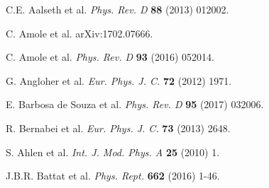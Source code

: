 \documentclass{article}
\begin{document}
\begin{thebibliography}{100}
C.E. Aalseth et al. \textit{Phys. Rev. D} \textbf{88} (2013) 012002.

C. Amole et al. arXiv:1702.07666.

C. Amole et al. \textit{Phys. Rev. D} \textbf{93} (2016) 052014.

G. Angloher et al. \textit{Eur. Phys. J. C.} \textbf{72} (2012) 1971.

E. Barbosa de Souza et al. \textit{Phys. Rev. D} \textbf{95} (2017) 032006.

R. Bernabei et al. \textit{Eur. Phys. J. C.} \textbf{73} (2013) 2648.






S. Ahlen et al. \textit{Int. J. Mod. Phys. A} \textbf{25} (2010) 1.

J.B.R. Battat et al. \textit{Phys. Rept.} \textbf{662} (2016) 1-46.

\end{thebibliography}
\end{document}
